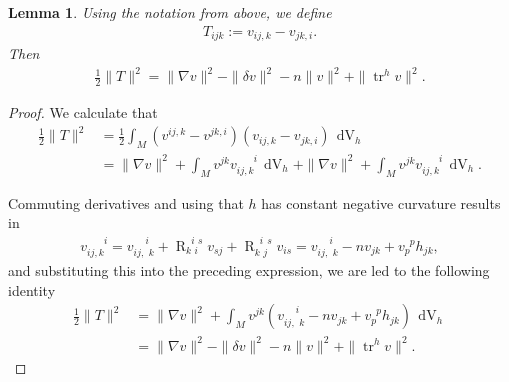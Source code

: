 \documentclass[10pt,reqno]{amsart}
\newtheorem{lemma}[theorem]{Lemma}
\DeclareMathOperator{\tr}{tr}
\DeclareMathOperator{\dvol}{dV}
\DeclareMathOperator{\R}{R}
\newcommand{\riem}{\R}
\newcommand{\riemdudu}[4]{\riem^{\phantom{#1} #2 \phantom{#3} #4}_{#1 \phantom{#2} #3}}
\newcommand{\vdu}[2]{v_{#1}^{\phantom{#1} #2}}
\newcommand{\vdddu}[4]{v_{#1 #2, #3}^{\phantom{#1#2,#3} #4}}
\newcommand{\vddud}[4]{v_{#1 #2, \phantom{#3} #4}^{\phantom{#1#2,} #3 \phantom{#4}}}
\begin{document}
\begin{lemma} Using the notation from above, we define 
\begin{align}
\label{def:3-tensorT}
 T_{i j k} := v_{i j, k} - v_{j k, i}. 
\end{align} 
Then
\begin{align} \label{eqn:koiso}
\frac{1}{2} \|T\|^2 = \| \nabla v \|^2 - \| \delta v \|^2 - n \| v\|^2 + \| \tr^h v\|^2.
\end{align}
\end{lemma}
\begin{proof}
We calculate that
\begin{align*}
\frac{1}{2} \|T\|^2 &= \frac{1}{2} \int_{M} (v^{ij ,k} - v^{jk,i})(v_{ij,k} - v_{j k,i}) \, \dvol_h \nonumber \\
&= \| \nabla v \|^2 + \int_{M} v^{j k} \vdddu{i}{j}{k}{i}  \, \dvol_h  + \| \nabla v \|^2 + \int_{M} v^{j k} \vdddu{i}{j}{k}{i} \, \dvol_h.
\end{align*}
	
Commuting derivatives and using  that $h$ has constant negative curvature results in
\begin{align*}
\vdddu{i}{j}{k}{i} = \vddud{i}{j}{i}{k} + \riemdudu{k}{i}{i}{s} v_{sj} + \riemdudu{k}{i}{j}{s} v_{i s} = \vddud{i}{j}{i}{k} - n v_{jk} + \vdu{p}{p} h_{j k}, 
\end{align*}
and substituting this into the preceding expression, we are led to the following identity
\begin{align*}
\frac{1}{2} \|T\|^2 &= \| \nabla v \|^2 + \int_{M} v^{j k} (\vddud{i}{j}{i}{k} - n v_{jk} + \vdu{p}{p} h_{j k}) \, \dvol_h \nonumber \\
&= \| \nabla v \|^2 - \| \delta v \|^2 - n \| v\|^2 + \| \tr^h v\|^2.
\end{align*}
\end{proof}
\end{document}
